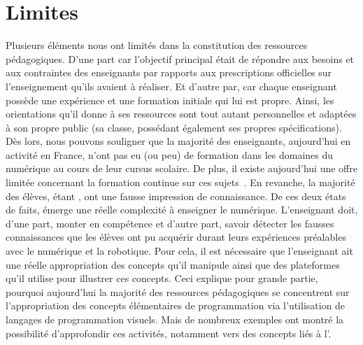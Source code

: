 \section{Limites}
    Plusieurs éléments nous ont limités dans la constitution des ressources pédagogiques. D'une part car l'objectif principal était de répondre aux besoins et aux contraintes des enseignants par rapports aux prescriptions officielles sur l'enseignement qu'ils avaient à réaliser. Et d'autre par, car chaque enseignant possède une expérience et une formation initiale qui lui est propre. Ainsi, les orientations qu'il donne à ses ressources sont tout autant personnelles et adaptées à son propre public (sa classe, possédant également ses propres spécifications). Dès lors, nous pouvons souligner que la majorité des enseignants, aujourd'hui en activité en France, n'ont pas eu (ou peu) de formation dans les domaines du numérique au cours de leur cursus scolaire. 
    De plus, il existe aujourd'hui une offre limitée concernant la formation continue sur ces sujets~. En revanche, la majorité des élèves, étant  , ont une fausse impression de connaissance. De ces deux états de faits, émerge une réelle complexité à enseigner le numérique. 
    L'enseignant doit, d'une part, monter en compétence et d'autre part, savoir détecter les fausses connaissances que les élèves ont pu acquérir durant leurs expériences préalables avec le numérique et la robotique. Pour cela, il est nécessaire que l'enseignant ait une réelle appropriation des concepts qu'il manipule ainsi que des plateformes qu'il utilise pour illustrer ces concepts. 
    Ceci explique pour grande partie, pourquoi aujourd'hui la majorité des ressources pédagogiques se concentrent sur l'appropriation des concepts élémentaires de programmation via l'utilisation de langages de programmation visuels. Mais de nombreux exemples  ont montré la possibilité d'approfondir ces activités, notamment vers des concepts liés à l'.